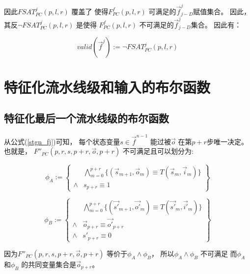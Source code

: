 因此$FSAT^j_{PC}(p,l,r)$ 覆盖了
使得$F^f_{PC}(p,l,r)$ 可满足的$\vec{f}^j_{j-D}$赋值集合。
因此，
其反$\neg FSAT^j_{PC}(p,l,r)$ 是使得
$F^f_{PC}(p,l,r)$ 不可满足的$\vec{f}^j_{j-D}$集合。
因此有：

\begin{equation}
valid(\vec{f}^j):=\neg FSAT^j_{PC}(p,l,r)
\end{equation}





\section{特征化流水线级和输入的布尔函数}\label{sec_char_chap6}
\subsection{特征化最后一个流水线级的布尔函数}

从公式(\ref{stgn_fj})可知，
每个状态变量$s\in \vec{f}^{n-1}$ 能过被$\vec{o}$ 在第$p+r$步唯一决定。
也就是，
$F''_{PC}(p,r,s,p+r,\vec{o},p+r)$ 不可满足且可以划分为:

\begin{equation}
 \phi_A :=
 \left\{
\begin{array}{cc}
&\bigwedge_{m=0}^{p+r}
\{
(\vec{s}_{m+1},\vec{o}_m)\equiv T(\vec{s}_m,\vec{i}_m)
\}
\\
\wedge& s_{p+r}\equiv 1
\end{array}
\right\}
\end{equation}

\begin{equation}
\phi_B :=
\left\{
\begin{array}{cc}
&\bigwedge_{m=0}^{p+r}
\{
(\vec{s'}_{m+1},\vec{o'}_m)\equiv T(\vec{s'}_m,\vec{i'}_m)
\}
\\
\wedge&\vec{o}_{p+r}\equiv \vec{o'}_{p+r} \\
\wedge& s'_{p+r}\equiv 0
\end{array}
\right\}
\end{equation}

因为$F''_{PC}(p,r,s,p+r,\vec{o},p+r)$ 等价于$\phi_A \wedge \phi_B$，
所以$\phi_A \wedge \phi_B$ 不可满足
而$\phi_A$ 和$\phi_B$ 的共同变量集合是$\vec{o}_{p+r}$。

